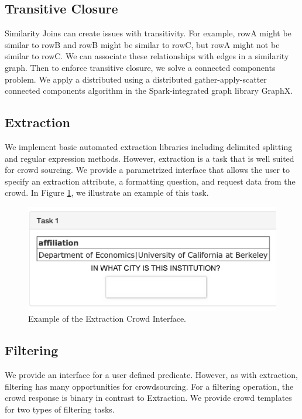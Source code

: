 \subsection{Transitive Closure}
Similarity Joins can create issues with transitivity.
For example, rowA might be similar to rowB and rowB might be similar to rowC, but rowA might not be similar to rowC.
We can associate these relationships with edges in a similarity graph.
Then to enforce transitive closure, we solve a connected components problem.
We apply a distributed using a distributed gather-apply-scatter connected components algorithm in the Spark-integrated graph library GraphX.

\subsection{Extraction}
We implement basic automated extraction libraries including delimited splitting and regular expression methods.
However, extraction is a task that is well suited for crowd sourcing.
We provide a parametrized interface that allows the user to specify an extraction attribute, a formatting question, and request data from the crowd.
In Figure \ref{fig:entry}, we illustrate an example of this task.

\begin{figure}[ht!]
\centering
\includegraphics[scale=0.25]{figs/entry.png}
\caption{Example of the Extraction Crowd Interface. \label{fig:entry}}\vspace{-.5em}
\end{figure}

\subsection{Filtering}
We provide an interface for a user defined predicate.
However, as with extraction, filtering has many opportunities for crowdsourcing.
For a filtering operation, the crowd response is binary in contrast to Extraction.
We provide crowd templates for two types of filtering tasks.

